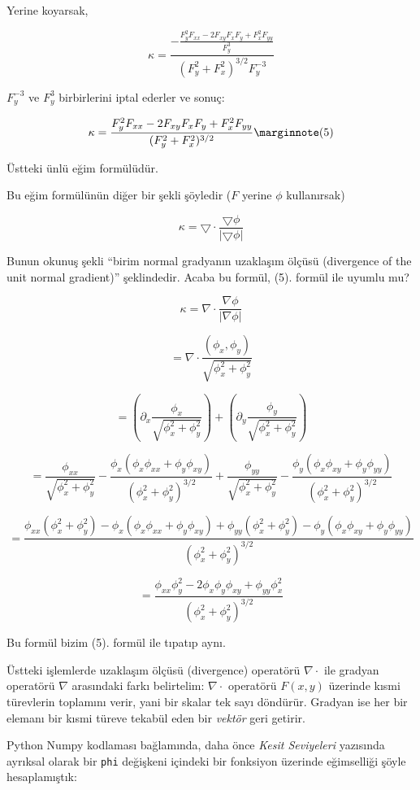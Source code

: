 \documentclass[12pt,fleqn]{article}\usepackage{../../common}
\begin{document}
Yerine koyarsak,

$$ 
\kappa = \frac{\displaystyle
- \frac{F_y^2F_{xx} - 2F_{xy}F_xF_y + F_x^2F_{yy}}{F_y^3}}
{(F_y^2 + F_x^2)^{3/2}F_y^{-3}}
 $$

$F_y^{-3}$ ve $F_y^{3}$ birbirlerini iptal ederler ve sonuç:

$$
\kappa = \frac{F_y^2F_{xx} - 2F_{xy}F_xF_y +
    F_x^2F_{yy}}{(F_y^2 + F_x^2)^{3/2}}
\mlabel{5}
$$

Üstteki ünlü eğim  formülüdür. 

Bu eğim formülünün diğer bir şekli şöyledir ($F$ yerine $\phi$ kullanırsak)

$$ \kappa = \bigtriangledown \cdot \frac{\bigtriangledown \phi}{|\bigtriangledown \phi|} $$

Bunun okunuş şekli ``birim normal gradyanın uzaklaşım ölçüsü (divergence of the
unit normal gradient)'' şeklindedir. Acaba bu formül, (5). formül ile
uyumlu mu?

$$ \kappa = \nabla \cdot \frac{\nabla \phi}{|\nabla \phi|}  $$

$$ = \nabla \cdot \frac{(\phi_x,\phi_y)}{\sqrt{\phi_x^2+\phi_y^2}} $$

$$ = \left(\partial_x \frac{\phi_x}{\sqrt{\phi_x^2+\phi_y^2}}\right)+ 
\left(\partial_y \frac{\phi_y}{\sqrt{\phi_x^2+\phi_y^2}}\right)  $$

$$ = \frac{\phi_{xx}}{\sqrt{\phi_x^2+\phi_y^2}} - \frac{\phi_x (\phi_x\phi_{xx}+\phi_y\phi_{xy})}
{(\phi_x^2+\phi_y^2)^{3/2}} +
\frac{\phi_{yy}}{\sqrt{\phi_x^2+\phi_y^2}} - \frac{\phi_y(\phi_x\phi_{xy}+\phi_y\phi_{yy})}
{(\phi_x^2+\phi_y^2)^{3/2}}  $$

$$ = \frac{\phi_{xx}(\phi_x^2+\phi_y^2) - \phi_x
  (\phi_x\phi_{xx}+\phi_y\phi_{xy}) +\phi_{yy}(\phi_x^2+\phi_y^2) -
  \phi_y(\phi_x\phi_{xy}+\phi_y\phi_{yy})}{(\phi_x^2+\phi_y^2)^{3/2}} $$

$$ = \frac{\phi_{xx}\phi_y^2 - 2\phi_x\phi_y\phi_{xy} + \phi_{yy}\phi_x^2}{(\phi_x^2+\phi_y^2)^{3/2}}  $$

Bu formül bizim (5). formül ile tıpatıp aynı.

Üstteki işlemlerde uzaklaşım ölçüsü (divergence) operatörü $\nabla \cdot$
ile gradyan operatörü $\nabla$ arasındaki farkı belirtelim: $\nabla \cdot$
operatörü $F(x,y)$ üzerinde kısmi türevlerin toplamını verir, yani bir
skalar tek sayı döndürür. Gradyan ise her bir elemanı bir kısmi türeve
tekabül eden bir {\em vektör} geri getirir.

Python Numpy kodlaması bağlamında, daha önce {\em Kesit Seviyeleri} yazısında
ayrıksal olarak bir \verb!phi! değişkeni içindeki bir fonksiyon üzerinde
eğimselliği şöyle hesaplamıştık:
\end{document}
